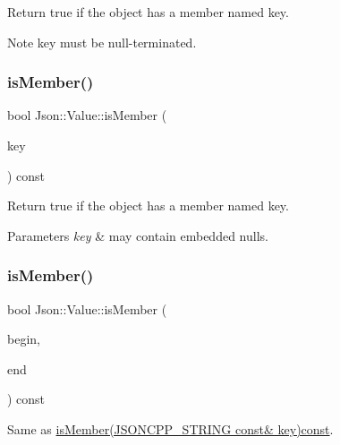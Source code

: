 Return true if the object has a member named key. \begin{DoxyNote}{Note}
\textquotesingle{}key\textquotesingle{} must be null-\/terminated. 
\end{DoxyNote}
\hypertarget{class_json_1_1_value_a0c2cd838217b23ee6bde8135de1b30d9}{}\label{class_json_1_1_value_a0c2cd838217b23ee6bde8135de1b30d9} 
\subsubsection{\texorpdfstring{is\+Member()}{isMember()}\hspace{0.1cm}{\footnotesize\ttfamily [2/6]}}
{\footnotesize\ttfamily bool Json\+::\+Value\+::is\+Member (\begin{DoxyParamCaption}\item[{const \hyperlink{config_8h_a1e723f95759de062585bc4a8fd3fa4be}{J\+S\+O\+N\+C\+P\+P\+\_\+\+S\+T\+R\+I\+NG} \&}]{key }\end{DoxyParamCaption}) const}

Return true if the object has a member named key. 
\begin{DoxyParams}{Parameters}
{\em key} & may contain embedded nulls. \\
\hline
\end{DoxyParams}
\hypertarget{class_json_1_1_value_a2007e1e51f21f44ecf1f13e4a1c567b9}{}\label{class_json_1_1_value_a2007e1e51f21f44ecf1f13e4a1c567b9} 
\subsubsection{\texorpdfstring{is\+Member()}{isMember()}\hspace{0.1cm}{\footnotesize\ttfamily [3/6]}}
{\footnotesize\ttfamily bool Json\+::\+Value\+::is\+Member (\begin{DoxyParamCaption}\item[{const char $\ast$}]{begin,  }\item[{const char $\ast$}]{end }\end{DoxyParamCaption}) const}



Same as \hyperlink{class_json_1_1_value_a0c2cd838217b23ee6bde8135de1b30d9}{is\+Member(\+J\+S\+O\+N\+C\+P\+P\+\_\+\+S\+T\+R\+I\+N\+G const\& key)const}. 

